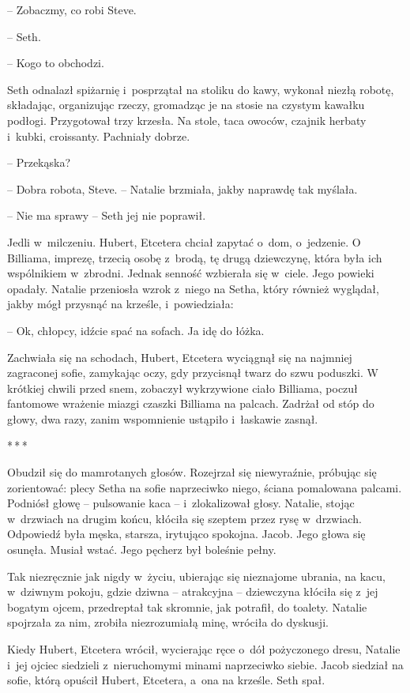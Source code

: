 \documentclass[oneside,polish,11pt,sfheadings]{mwbk}
\newcommand{\threeast}{\bigskip\par\centerline{*\,*\,*}\medskip\par}
\begin{document}
-- Zobaczmy, co robi Steve.

-- Seth.

-- Kogo to obchodzi.

Seth odnalazł spiżarnię i~posprzątał na stoliku do kawy, wykonał niezłą
robotę, składając, organizując rzeczy, gromadząc je na stosie na czystym
kawałku podłogi. Przygotował trzy krzesła. Na stole, taca owoców,
czajnik herbaty i~kubki, croissanty. Pachniały dobrze.

-- Przekąska?

-- Dobra robota, Steve. -- Natalie brzmiała, jakby naprawdę tak myślała.

-- Nie ma sprawy -- Seth jej nie poprawił.

Jedli w~milczeniu. Hubert, Etcetera chciał zapytać o~dom, o~jedzenie. O
Billiama, imprezę, trzecią osobę z~brodą, tę drugą dziewczynę, która
była ich wspólnikiem w~zbrodni. Jednak senność wzbierała się w~ciele.
Jego powieki opadały. Natalie przeniosła wzrok z~niego na Setha, który
również wyglądał, jakby mógł przysnąć na krześle, i~powiedziała: 

-- Ok, chłopcy, idźcie spać na sofach. Ja idę do łóżka.

Zachwiała się na schodach, Hubert, Etcetera wyciągnął się na najmniej
zagraconej sofie, zamykając oczy, gdy przycisnął twarz do szwu poduszki.
W krótkiej chwili przed snem, zobaczył wykrzywione ciało Billiama,
poczuł fantomowe wrażenie miazgi czaszki Billiama na palcach. Zadrżał od
stóp do głowy, dwa razy, zanim wspomnienie ustąpiło i~łaskawie zasnął.

\threeast

Obudził się do mamrotanych głosów. Rozejrzał się niewyraźnie, próbując
się zorientować: plecy Setha na sofie naprzeciwko niego, ściana
pomalowana palcami. Podniósł głowę -- pulsowanie kaca -- i~zlokalizował
głosy. Natalie, stojąc w~drzwiach na drugim końcu, kłóciła się szeptem
przez rysę w~drzwiach. Odpowiedź była męska, starsza, irytująco
spokojna. Jacob. Jego głowa się osunęła. Musiał wstać. Jego pęcherz był
boleśnie pełny.

Tak niezręcznie jak nigdy w~życiu, ubierając się nieznajome ubrania, na
kacu, w~dziwnym pokoju, gdzie dziwna -- atrakcyjna -- dziewczyna kłóciła
się z~jej bogatym ojcem, przedreptał tak skromnie, jak potrafił, do
toalety. Natalie spojrzała za nim, zrobiła niezrozumiałą minę, wróciła
do dyskusji.

Kiedy Hubert, Etcetera wrócił, wycierając ręce o~dół pożyczonego dresu,
Natalie i~jej ojciec siedzieli z~nieruchomymi minami naprzeciwko siebie.
Jacob siedział na sofie, którą opuścił Hubert, Etcetera, a~ona na
krześle. Seth spał.
\end{document}
